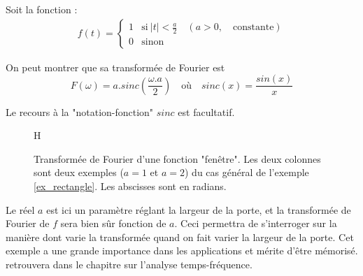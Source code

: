 \begin{example}
\label{ex_rectangle}

Soit la fonction :
\begin{eqnarray}
    f(t)=
\begin{cases}
  1   & \text{si}~ |t|<\frac{a}{2} \quad (a>0, \quad \text{constante}) \\
  0 & \text{sinon} 
\end{cases}
\end{eqnarray}

On peut montrer que sa transformée de Fourier est 
\begin{equation}
F(\omega)= a.sinc(\frac{\omega.a}{2}) \quad \text{où} \quad sinc(x)=\frac{sin(x)}{x}
\end{equation}

Le recours à la "notation-fonction" $sinc$ est facultatif.

\begin{figure}{H}
\begin{center}
\hspace*{2cm}
\caption{Transformée de Fourier d'une fonction "fenêtre". Les deux colonnes sont deux exemples ($a=1$ et $a=2$) du cas général de l'exemple \ref{ex_rectangle}. Les abscisses sont en radians.}
\end{center}
\label{fourier_transform_example}
\end{figure}

Le réel $a$ est ici un paramètre réglant la largeur de la porte, et la
transformée de Fourier de $f$ sera bien sûr fonction de $a$. Ceci
permettra de s'interroger sur la manière dont varie la transformée
quand on fait varier la largeur de la porte.  Cet exemple a une grande
importance dans les applications et mérite d'être mémorisé. %
retrouvera dans le chapitre sur l'analyse temps-fréquence.

\end{example}

